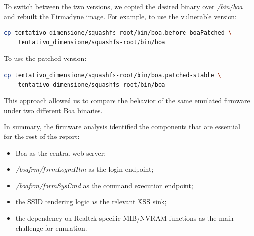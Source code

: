               To switch between the two versions, we copied the desired binary over \emph{/bin/boa} and rebuilt the Firmadyne image. For example, to use the vulnerable version:

\begin{lstlisting}[language=bash]
cp tentativo_dimensione/squashfs-root/bin/boa.before-boaPatched \
    tentativo_dimensione/squashfs-root/bin/boa
\end{lstlisting}

              To use the patched version:

\begin{lstlisting}[language=bash]
cp tentativo_dimensione/squashfs-root/bin/boa.patched-stable \
    tentativo_dimensione/squashfs-root/bin/boa
\end{lstlisting}

              This approach allowed us to compare the behavior of the same emulated firmware under two different Boa binaries.

              In summary, the firmware analysis identified the components that are essential for the rest of the report:
              \begin{itemize}
                  \item Boa as the central web server;
                  \item \emph{/boafrm/formLoginHtm} as the login endpoint;
                  \item \emph{/boafrm/formSysCmd} as the command execution endpoint;
                  \item the SSID rendering logic as the relevant XSS sink;
                  \item the dependency on Realtek-specific MIB/NVRAM functions as the main challenge for emulation.
              \end{itemize}          